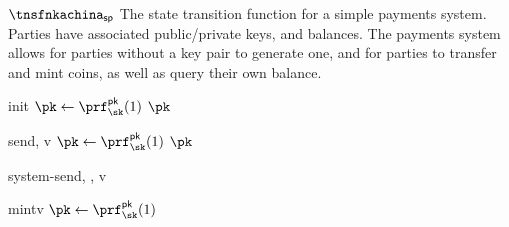 \begin{transitionfn}{$\tnsfnkachina_{\mathsf{sp}}$}
  The state transition function for a simple payments system. Parties have
  associated public/private keys, and balances. The payments system allows for
  parties without a key pair to generate one, and for parties to transfer and
  mint coins, as well as query their own balance.

  \begin{pubstatedecl}
  \end{pubstatedecl}
  \begin{privstatedecl}
  \end{privstatedecl}

  \begin{receiveinput}{init}{}
    \mkpriv
    \State {}
    \mknorm
    \State \Let $\pk \gets \prf_{\sk}^{\mathsf{pk}}(1)$
    \State \Return $\pk$
  \end{receiveinput}

  \begin{receiveinput}{send}{, v}
    \mkpriv
    \State {}
    \mknorm
    \State \Let $\pk \gets \prf_{\sk}^{\mathsf{pk}}(1)$
    \mkpub
    \State {}
    \mknorm
    \State \Return $\pk$
  \end{receiveinput}

  \begin{receiveinput}{system-send}{, , v}
    \mkpub
    \State {}
    \mknorm
  \end{receiveinput}

  \begin{receiveinput}{mint}{v}
    \mkpriv
    \State {}
    \mknorm
    \State \Let $\pk \gets \prf_{\sk}^{\mathsf{pk}}(1)$
    \mkpub
    \State {}
    \mknorm
  \end{receiveinput}


\end{transitionfn}
